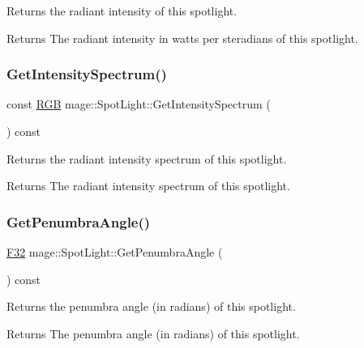 Returns the radiant intensity of this spotlight.

\begin{DoxyReturn}{Returns}
The radiant intensity in watts per steradians of this spotlight. 
\end{DoxyReturn}
\hypertarget{classmage_1_1_spot_light_ad05d3abab9285f8c25ac42ee446d6e05}{}\label{classmage_1_1_spot_light_ad05d3abab9285f8c25ac42ee446d6e05} 
\subsubsection{\texorpdfstring{Get\+Intensity\+Spectrum()}{GetIntensitySpectrum()}}
{\footnotesize\ttfamily const \hyperlink{structmage_1_1_r_g_b}{R\+GB} mage\+::\+Spot\+Light\+::\+Get\+Intensity\+Spectrum (\begin{DoxyParamCaption}{ }\end{DoxyParamCaption}) const\hspace{0.3cm}{\ttfamily [noexcept]}}

Returns the radiant intensity spectrum of this spotlight.

\begin{DoxyReturn}{Returns}
The radiant intensity spectrum of this spotlight. 
\end{DoxyReturn}
\hypertarget{classmage_1_1_spot_light_a37d61501193f5ed4ecefe4015595ed89}{}\label{classmage_1_1_spot_light_a37d61501193f5ed4ecefe4015595ed89} 
\subsubsection{\texorpdfstring{Get\+Penumbra\+Angle()}{GetPenumbraAngle()}}
{\footnotesize\ttfamily \hyperlink{namespacemage_aa97e833b45f06d60a0a9c4fc22ae02c0}{F32} mage\+::\+Spot\+Light\+::\+Get\+Penumbra\+Angle (\begin{DoxyParamCaption}{ }\end{DoxyParamCaption}) const\hspace{0.3cm}{\ttfamily [noexcept]}}

Returns the penumbra angle (in radians) of this spotlight.

\begin{DoxyReturn}{Returns}
The penumbra angle (in radians) of this spotlight. 
\end{DoxyReturn}
\hypertarget{classmage_1_1_spot_light_afcfb600550f5ca9292e79e5bedb9fad7}{}\label{classmage_1_1_spot_light_afcfb600550f5ca9292e79e5bedb9fad7} 

